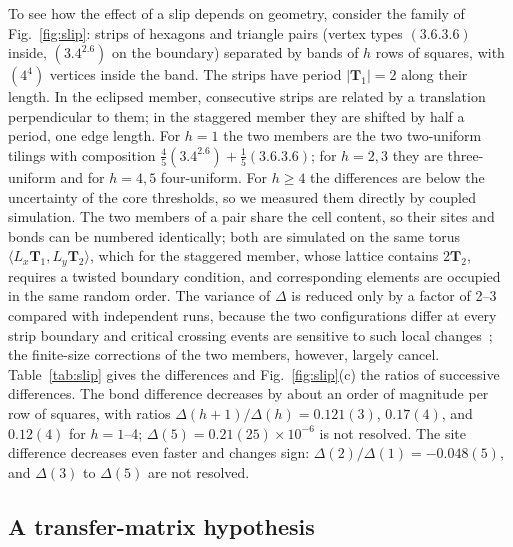 \documentclass[pre,twocolumn,superscriptaddress,longbibliography,floatfix]{revtex4-2}
\begin{document}
To see how the effect of a slip depends on geometry, consider the family of Fig.~\ref{fig:slip}: strips of hexagons and triangle pairs (vertex types $(3.6.3.6)$ inside, $(3.4^2.6)$ on the boundary) separated by bands of $h$ rows of squares, with $(4^4)$ vertices inside the band. The strips have period $|\mathbf T_1|=2$ along their length. In the eclipsed member, consecutive strips are related by a translation perpendicular to them; in the staggered member they are shifted by half a period, one edge length. For $h=1$ the two members are the two two-uniform tilings with composition $\tfrac45(3.4^2.6)+\tfrac15(3.6.3.6)$; for $h=2,3$ they are three-uniform and for $h=4,5$ four-uniform. For $h\ge4$ the differences are below the uncertainty of the core thresholds, so we measured them directly by coupled simulation. The two members of a pair share the cell content, so their sites and bonds can be numbered identically; both are simulated on the same torus $\langle L_x\mathbf T_1,L_y\mathbf T_2\rangle$, which for the staggered member, whose lattice contains $2\mathbf T_2$, requires a twisted boundary condition, and corresponding elements are occupied in the same random order. The variance of $\Delta$ is reduced only by a factor of 2--3 compared with independent runs, because the two configurations differ at every strip boundary and critical crossing events are sensitive to such local changes~\cite{BenjaminiKalaiSchramm99}; the finite-size corrections of the two members, however, largely cancel. Table~\ref{tab:slip} gives the differences and Fig.~\ref{fig:slip}(c) the ratios of successive differences. The bond difference decreases by about an order of magnitude per row of squares, with ratios $\Delta(h+1)/\Delta(h)=0.121(3)$, $0.17(4)$, and $0.12(4)$ for $h=1$--4; $\Delta(5)=0.21(25)\times10^{-6}$ is not resolved. The site difference decreases even faster and changes sign: $\Delta(2)/\Delta(1)=-0.048(5)$, and $\Delta(3)$ to $\Delta(5)$ are not resolved.

\subsection{A transfer-matrix hypothesis}
\end{document}
